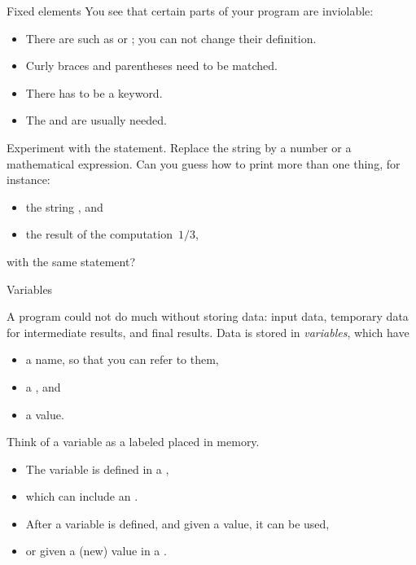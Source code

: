\begin{block}{Fixed elements}
  \label{sl:fixedstuff}
  You see that certain parts of your program are inviolable:
  \begin{itemize}
  \item There are  such as  or ; you
    can not change their definition.
  \item Curly braces and parentheses need to be matched.
  \item There has to be a  keyword.
  \item The  and  are usually needed.
  \end{itemize}
\end{block}

\begin{exercise}
  \label{ex:cout-what}
  Experiment with the  statement. Replace the string by a
  number or a mathematical expression. Can you guess how to print more
  than one thing, for instance:
  \begin{itemize}
  \item the string , and
  \item the result of the computation~$1/3$,     
  \end{itemize}
  with the same  statement?
\end{exercise}

 {Variables}
\label{sec:variables}

A program could not do much without storing data: input data,
temporary data for intermediate results, and final results.
Data is stored in \emph{variables},  which have
\begin{itemize}
\item a name, so that you can refer to them,
\item a , and
\item a value.
\end{itemize}
Think of a variable as a labeled placed in memory.
\begin{itemize}
\item The variable is defined in a
  ,
\item which can include an .
\item After a variable is defined, and given a value, it can be used,
\item or given a (new) value in a .
\end{itemize}

